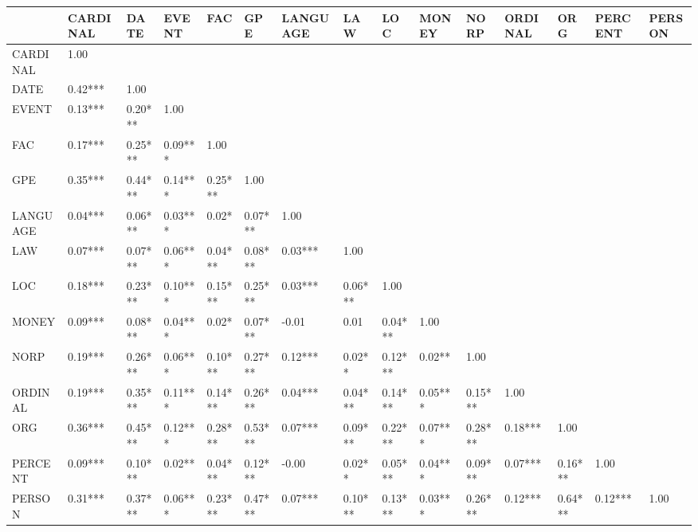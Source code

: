 \begin{tabular}{@{}lllllllllllllll@{}}
    \toprule
             & CARDINAL & DATE    & EVENT   & FAC     & GPE     & LANGUAGE & LAW     & LOC     & MONEY   & NORP    & ORDINAL & ORG     & PERCENT & PERSON \\ \midrule
    CARDINAL & 1.00     &         &         &         &         &          &         &         &         &         &         &         &         &        \\
    DATE     & 0.42***  & 1.00    &         &         &         &          &         &         &         &         &         &         &         &        \\
    EVENT    & 0.13***  & 0.20*** & 1.00    &         &         &          &         &         &         &         &         &         &         &        \\
    FAC      & 0.17***  & 0.25*** & 0.09*** & 1.00    &         &          &         &         &         &         &         &         &         &        \\
    GPE      & 0.35***  & 0.44*** & 0.14*** & 0.25*** & 1.00    &          &         &         &         &         &         &         &         &        \\
    LANGUAGE & 0.04***  & 0.06*** & 0.03*** & 0.02*   & 0.07*** & 1.00     &         &         &         &         &         &         &         &        \\
    LAW      & 0.07***  & 0.07*** & 0.06*** & 0.04*** & 0.08*** & 0.03***  & 1.00    &         &         &         &         &         &         &        \\
    LOC      & 0.18***  & 0.23*** & 0.10*** & 0.15*** & 0.25*** & 0.03***  & 0.06*** & 1.00    &         &         &         &         &         &        \\
    MONEY    & 0.09***  & 0.08*** & 0.04*** & 0.02*   & 0.07*** & -0.01    & 0.01    & 0.04*** & 1.00    &         &         &         &         &        \\
    NORP     & 0.19***  & 0.26*** & 0.06*** & 0.10*** & 0.27*** & 0.12***  & 0.02**  & 0.12*** & 0.02**  & 1.00    &         &         &         &        \\
    ORDINAL  & 0.19***  & 0.35*** & 0.11*** & 0.14*** & 0.26*** & 0.04***  & 0.04*** & 0.14*** & 0.05*** & 0.15*** & 1.00    &         &         &        \\
    ORG      & 0.36***  & 0.45*** & 0.12*** & 0.28*** & 0.53*** & 0.07***  & 0.09*** & 0.22*** & 0.07*** & 0.28*** & 0.18*** & 1.00    &         &        \\
    PERCENT  & 0.09***  & 0.10*** & 0.02**  & 0.04*** & 0.12*** & -0.00    & 0.02**  & 0.05*** & 0.04*** & 0.09*** & 0.07*** & 0.16*** & 1.00    &        \\
    PERSON   & 0.31***  & 0.37*** & 0.06*** & 0.23*** & 0.47*** & 0.07***  & 0.10*** & 0.13*** & 0.03*** & 0.26*** & 0.12*** & 0.64*** & 0.12*** & 1.00   \\ \bottomrule
    \end{tabular}